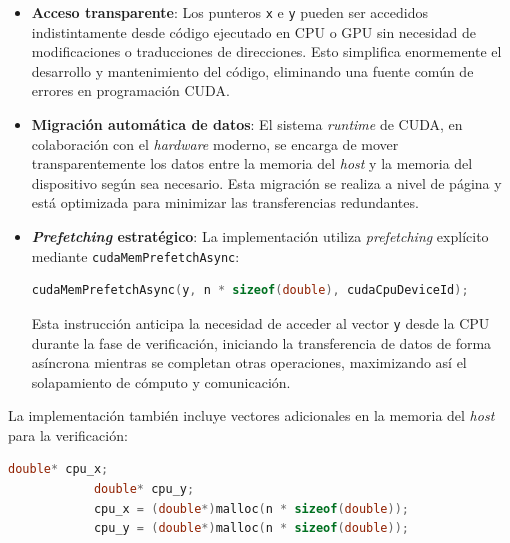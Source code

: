         \begin{itemize}
        
            \item \textbf{Acceso transparente}: Los punteros \texttt{x} e \texttt{y} pueden ser accedidos indistintamente desde código ejecutado en CPU o GPU sin necesidad de modificaciones o traducciones de direcciones. Esto simplifica enormemente el desarrollo y mantenimiento del código, eliminando una fuente común de errores en programación CUDA.
            
            \item \textbf{Migración automática de datos}: El sistema \textit{runtime} de CUDA, en colaboración con el \textit{hardware} moderno, se encarga de mover transparentemente los datos entre la memoria del \textit{host} y la memoria del dispositivo según sea necesario. Esta migración se realiza a nivel de página y está optimizada para minimizar las transferencias redundantes.
            
            \item \textbf{\textit{Prefetching} estratégico}: La implementación utiliza \textit{prefetching} explícito mediante \texttt{cudaMemPrefetchAsync}:
            
                \begin{lstlisting}[language=C, caption={Uso de \texttt{cudaMemPrefetchAsync}.}, gobble=20]
                    cudaMemPrefetchAsync(y, n * sizeof(double), cudaCpuDeviceId);
                \end{lstlisting}
            
                Esta instrucción anticipa la necesidad de acceder al vector \texttt{y} desde la CPU durante la fase de verificación, iniciando la transferencia de datos de forma asíncrona mientras se completan otras operaciones, maximizando así el solapamiento de cómputo y comunicación.
            
        \end{itemize}

        La implementación también incluye vectores adicionales en la memoria del \textit{host} para la verificación:

        \begin{lstlisting}[language=C, caption={\textit{Alloc} de memoria en el \textit{host}.}, gobble=12]
            double* cpu_x;
            double* cpu_y;
            cpu_x = (double*)malloc(n * sizeof(double));
            cpu_y = (double*)malloc(n * sizeof(double));
        \end{lstlisting}
        
